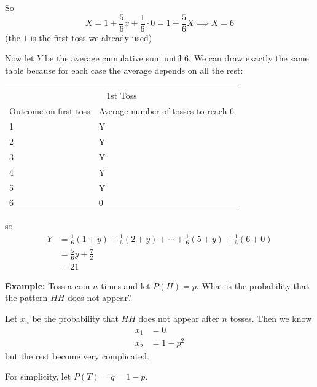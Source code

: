 \documentclass[12pt]{report}
\begin{document}
    So 
    \[X = 1 + \frac{5}{6}x + \frac{1}{6}\cdot 0 = 1 + \frac{5}{6}X \implies \boxed{X = 6}\] 
    (the $1$ is the first toss we already used) 

    Now let $Y$ be the average cumulative sum until 6. We can draw exactly the same table because for each case the average depends on all the rest: 
    
    \begin{center}
        \begin{tabular}{|p{1in}p{1in}|}
            \hline\\
            \multicolumn{2}{c}{1st Toss}\\ 
            Outcome on first toss & Average number of tosses to reach 6\\ 
            \hline
            1 & Y\\ 
            2 & Y \\ 
            3 & Y\\ 
            4 & Y\\ 
            5 & Y\\ 
            6 & 0\\ 
            \hline
        \end{tabular}
    \end{center}
    
    so 
    \begin{align*}
        Y &= \frac{1}{6}(1 + y) + \frac{1}{6}(2 + y) + \cdots + \frac{1}{6}(5 + y) + \frac{1}{6}(6 + 0)\\ 
        &= \frac{5}{6}y + \frac{7}{2}\\ 
        &= 21
    \end{align*}

    \textbf{Example:} Toss a coin $n$ times and let $P(H) = p$. What is the probability that the pattern $HH$ does not appear? 

    Let $x_n$ be the probability that $HH$ does not appear after $n$ tosses. Then we know 
    \begin{align*}
        x_1 &= 0\\ 
        x_2 &= 1 - p^2
    \end{align*}
    but the rest become very complicated. 

    For simplicity, let $P(T) = q = 1 - p$.

    \begin{center}
    \end{center}
\end{document}
